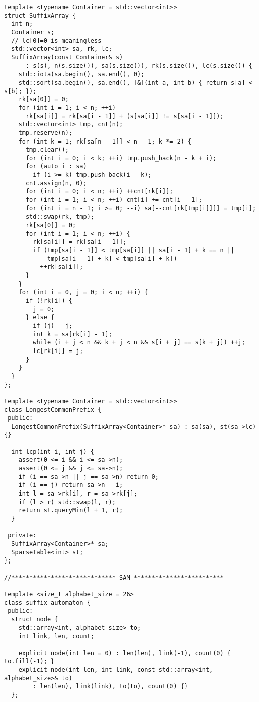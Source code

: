 \documentclass[6pt]{article}
\begin{document}
\begin{multicols}{2}
\begin{lstlisting}
template <typename Container = std::vector<int>>
struct SuffixArray {
  int n;
  Container s;
  // lc[0]=0 is meaningless
  std::vector<int> sa, rk, lc;
  SuffixArray(const Container& s)
      : s(s), n(s.size()), sa(s.size()), rk(s.size()), lc(s.size()) {
    std::iota(sa.begin(), sa.end(), 0);
    std::sort(sa.begin(), sa.end(), [&](int a, int b) { return s[a] < s[b]; });
    rk[sa[0]] = 0;
    for (int i = 1; i < n; ++i)
      rk[sa[i]] = rk[sa[i - 1]] + (s[sa[i]] != s[sa[i - 1]]);
    std::vector<int> tmp, cnt(n);
    tmp.reserve(n);
    for (int k = 1; rk[sa[n - 1]] < n - 1; k *= 2) {
      tmp.clear();
      for (int i = 0; i < k; ++i) tmp.push_back(n - k + i);
      for (auto i : sa)
        if (i >= k) tmp.push_back(i - k);
      cnt.assign(n, 0);
      for (int i = 0; i < n; ++i) ++cnt[rk[i]];
      for (int i = 1; i < n; ++i) cnt[i] += cnt[i - 1];
      for (int i = n - 1; i >= 0; --i) sa[--cnt[rk[tmp[i]]]] = tmp[i];
      std::swap(rk, tmp);
      rk[sa[0]] = 0;
      for (int i = 1; i < n; ++i) {
        rk[sa[i]] = rk[sa[i - 1]];
        if (tmp[sa[i - 1]] < tmp[sa[i]] || sa[i - 1] + k == n ||
            tmp[sa[i - 1] + k] < tmp[sa[i] + k])
          ++rk[sa[i]];
      }
    }
    for (int i = 0, j = 0; i < n; ++i) {
      if (!rk[i]) {
        j = 0;
      } else {
        if (j) --j;
        int k = sa[rk[i] - 1];
        while (i + j < n && k + j < n && s[i + j] == s[k + j]) ++j;
        lc[rk[i]] = j;
      }
    }
  }
};

template <typename Container = std::vector<int>>
class LongestCommonPrefix {
 public:
  LongestCommonPrefix(SuffixArray<Container>* sa) : sa(sa), st(sa->lc) {}

  int lcp(int i, int j) {
    assert(0 <= i && i <= sa->n);
    assert(0 <= j && j <= sa->n);
    if (i == sa->n || j == sa->n) return 0;
    if (i == j) return sa->n - i;
    int l = sa->rk[i], r = sa->rk[j];
    if (l > r) std::swap(l, r);
    return st.queryMin(l + 1, r);
  }

 private:
  SuffixArray<Container>* sa;
  SparseTable<int> st;
};

//***************************** SAM *************************

template <size_t alphabet_size = 26>
class suffix_automaton {
 public:
  struct node {
    std::array<int, alphabet_size> to;
    int link, len, count;

    explicit node(int len = 0) : len(len), link(-1), count(0) { to.fill(-1); }
    explicit node(int len, int link, const std::array<int, alphabet_size>& to)
        : len(len), link(link), to(to), count(0) {}
  };


\end{lstlisting}
\end{multicols}
\end{document}
